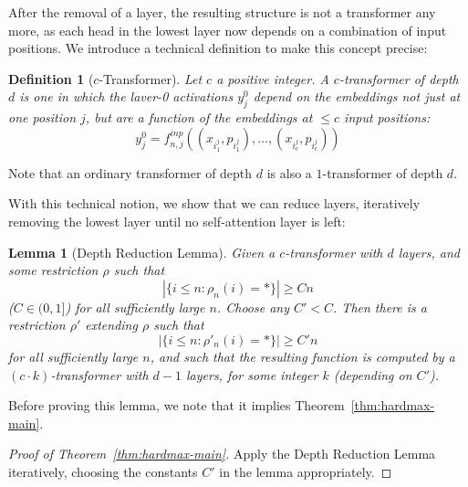 \documentclass[11pt,a4paper]{article}
\newcounter{theorem}
\newtheorem{defin}[theorem]{Definition}
\newtheorem{lemma}[theorem]{Lemma}
\begin{document}
After the removal of a layer, the resulting structure is not a transformer any more, as each head in the lowest layer now depends on a combination of input positions.
We introduce a technical definition to make this concept precise:

\begin{defin}[$c$-Transformer]
Let $c$ a positive integer. A $c$-transformer of depth $d$ is one in which the laver-0 activations $y_j^0$ depend on the embeddings not just at one position $j$, but are a function of the embeddings at $\leq c$ input positions:
\begin{equation}
    y_j^0 = f^{inp}_{n,j}((x_{i_1^j}, p_{i_1^j}), \dots, (x_{i_c^j}, p_{i_c^j} ))
\end{equation}
\end{defin}

Note that an ordinary transformer  of depth $d$ is also a $1$-transformer of depth $d$.


With this technical notion, we show that we can reduce layers, iteratively removing the lowest layer until no self-attention layer is left:
\begin{lemma}[Depth Reduction Lemma]
Given a $c$-transformer with $d$ layers, and some restriction $\rho$ such that
\begin{equation}
|\{i \leq n: \rho_n(i) = *\}| \geq Cn
\end{equation}
($C \in (0,1]$)
for all sufficiently large $n$.
Choose any $C' < C$.
Then there is a restriction $\rho'$ extending $\rho$ 
such that
\begin{equation}
|\{i \leq n: \rho'_n(i) = *\}| \geq C'n
\end{equation}
for all sufficiently large $n$, 
and such that the resulting function is computed by a $(c\cdot k)$-transformer with $d-1$ layers, for some integer $k$ (depending on $C'$).
\end{lemma}
Before proving this lemma, we note that it implies Theorem~\ref{thm:hardmax-main}.
\begin{proof}[Proof of Theorem~\ref{thm:hardmax-main}]
Apply the Depth Reduction Lemma iteratively, choosing the constants $C'$ in the lemma appropriately.
\end{proof}


\end{document}
